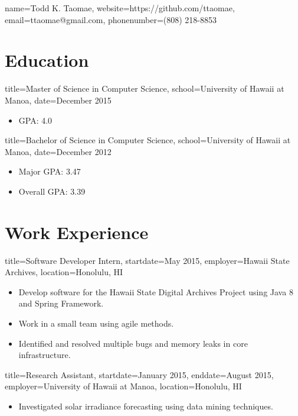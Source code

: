 \documentclass{resume}
\begin{document}
\begin{header}{name=Todd K. Taomae,
            website=https://github.com/ttaomae,
            email=ttaomae@gmail.com,
            phonenumber=(808) 218-8853}
\end{header}

\section*{Education}
\begin{degree}{title=Master of Science in Computer Science,
               school=University of Hawaii at Manoa,
               date=December 2015}
    \begin{itemize}
        \item{GPA: 4.0}
    \end{itemize}
\end{degree}

\begin{degree}{title=Bachelor of Science in Computer Science,
               school=University of Hawaii at Manoa,
               date=December 2012}
    \begin{itemize}
        \item{Major GPA: 3.47}
        \item{Overall GPA: 3.39}
    \end{itemize}
\end{degree}

\section*{Work Experience}
\begin{job}{title=Software Developer Intern,
            startdate=May 2015,
            employer=Hawaii State Archives,
            location={Honolulu, HI}}
    \begin{itemize}
        \item{Develop software for the Hawaii State Digital Archives Project using Java 8 and Spring Framework.}
        \item{Work in a small team using agile methods.}
        \item{Identified and resolved multiple bugs and memory leaks in core infrastructure.}
    \end{itemize}
\end{job}

\begin{job}{title=Research Assistant,
            startdate=January 2015,
            enddate=August 2015,
            employer=University of Hawaii at Manoa,
            location={Honolulu, HI}}
    \begin{itemize}
        \item{Investigated solar irradiance forecasting using data mining techniques.}
    \end{itemize}
\end{job}
\end{document}
